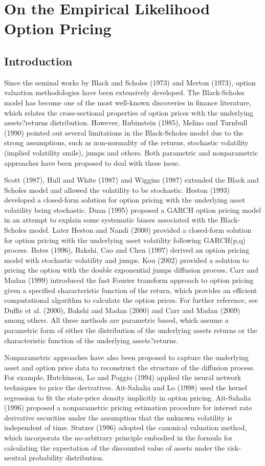 \chapter{On the Empirical Likelihood Option Pricing}
\section{Introduction}
Since the seminal works by Black and Scholes (1973) and Merton (1973), option valuation methodologies have been extensively developed. The Black-Scholes model has become one of the most well-known discoveries in finance literature, which relates the cross-sectional properties of option prices with the underlying assets?returns distribution. However, Rubinstein (1985), Melino and Turnbull (1990) pointed out several limitations in the Black-Scholes model due to the strong assumptions, such as non-normality of the returns, stochastic volatility (implied volatility smile), jumps and others. Both parametric and nonparametric approaches have been proposed to deal with these issue.  

Scott (1987), Hull and White (1987) and Wiggins (1987) extended the Black and Scholes model and allowed the volatility to be stochastic. Heston (1993) developed a closed-form solution for option pricing with the underlying asset volatility being stochastic. Duan (1995) proposed a GARCH option pricing model in an attempt to explain some systematic biases associated with the Black-Scholes model. Later Heston and Nandi (2000) provided a closed-form solution for option pricing with the underlying asset volatility following GARCH(p,q) process. Bates (1996), Bakshi, Cao and Chen (1997) derived an option pricing model with stochastic volatility and jumps. Kou (2002) provided a solution to pricing the option with the double exponential jumps diffusion process. Carr and Madan (1999) introduced the fast Fourier transform approach to option pricing given a specified characteristic function of the return, which provides an efficient computational algorithm to calculate the option prices. For further reference, see Duffie et al. (2000), Bakshi and Madan (2000) and Carr and Madan (2009) among others. All these methods are parametric based, which assume a parametric form of either the distribution of the underlying assets returns or the characteristic function of the underlying assets?returns. 

Nonparametric approaches have also been proposed to capture the underlying asset and option price data to reconstruct the structure of the diffusion process. For example, Hutchinson, Lo and Poggio (1994) applied the neural network techniques to price the derivatives. Ait-Sahalia and Lo (1998) used the kernel regression to fit the state-price density implicitly in option pricing. Ait-Sahalia (1996) proposed a nonparametric pricing estimation procedure for interest rate derivative securities under the assumption that the unknown volatility is independent of time. Stutzer (1996) adopted the canonical valuation method, which incorporats the no-arbitrary principle embodied in the formula for calculating the expectation of the discounted value of assets under the risk-neutral probability distribution. 


